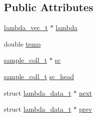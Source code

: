 \subsection*{\-Public \-Attributes}
\begin{DoxyCompactItemize}
\item 
\hyperlink{structlambda__vec__t}{lambda\-\_\-vec\-\_\-t} $\ast$ \hyperlink{structlambda__data__t_a8c3a264e5f68a88a8112966a1b95e070}{lambda}
\item 
double \hyperlink{structlambda__data__t_ae4758334717032942626072636862f7a}{temp}
\item 
\hyperlink{structsample__coll__t}{sample\-\_\-coll\-\_\-t} $\ast$ \hyperlink{structlambda__data__t_a7fd958960cc0b9391c0f8982f2c5f108}{sc}
\item 
\hyperlink{structsample__coll__t}{sample\-\_\-coll\-\_\-t} \hyperlink{structlambda__data__t_a454872233ee65fd4a1afb865e390464c}{sc\-\_\-head}
\item 
struct \hyperlink{structlambda__data__t}{lambda\-\_\-data\-\_\-t} $\ast$ \hyperlink{structlambda__data__t_a911037b4758b690460043d4db0f25556}{next}
\item 
struct \hyperlink{structlambda__data__t}{lambda\-\_\-data\-\_\-t} $\ast$ \hyperlink{structlambda__data__t_ad0163124af1988e1d26bf089fe78a772}{prev}
\end{DoxyCompactItemize}


